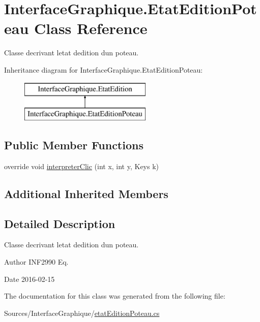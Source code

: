 \hypertarget{class_interface_graphique_1_1_etat_edition_poteau}{}\section{Interface\+Graphique.\+Etat\+Edition\+Poteau Class Reference}
\label{class_interface_graphique_1_1_etat_edition_poteau}


Classe decrivant l\textquotesingle{}etat d\textquotesingle{}edition d\textquotesingle{}un poteau.  


Inheritance diagram for Interface\+Graphique.\+Etat\+Edition\+Poteau\+:\begin{figure}[H]
\begin{center}
\leavevmode
\includegraphics[height=2.000000cm]{class_interface_graphique_1_1_etat_edition_poteau}
\end{center}
\end{figure}
\subsection*{Public Member Functions}
\begin{DoxyCompactItemize}
\item 
override void \hyperlink{group__inf2990_ga02ab06168c741d02e3ff643247aba300}{interpreter\+Clic} (int x, int y, Keys k)
\end{DoxyCompactItemize}
\subsection*{Additional Inherited Members}


\subsection{Detailed Description}
Classe decrivant l\textquotesingle{}etat d\textquotesingle{}edition d\textquotesingle{}un poteau. 

\begin{DoxyAuthor}{Author}
I\+N\+F2990 Eq. 
\end{DoxyAuthor}
\begin{DoxyDate}{Date}
2016-\/02-\/15 
\end{DoxyDate}


The documentation for this class was generated from the following file\+:\begin{DoxyCompactItemize}
\item 
Sources/\+Interface\+Graphique/\hyperlink{etat_edition_poteau_8cs}{etat\+Edition\+Poteau.\+cs}\end{DoxyCompactItemize}
